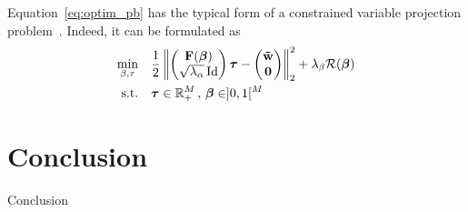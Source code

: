 Equation~\eqref{eq:optim_pb} has the typical form of a constrained variable
projection problem~\cite{Golub_G_2003_j-inv-prob_separable_nlsvpma}.
Indeed, it can be formulated as
\begin{equation}
  \begin{aligned}
    \min_{\beta,\tau} \quad &
    \frac{1}{2} \left\lVert\begin{pmatrix}\mathbf{F}(\boldsymbol{\beta}) \\ \sqrt{\lambda_{\alpha}}\operatorname{\mathrm{Id}}\end{pmatrix}\boldsymbol{\tau}
        - \begin{pmatrix}\boldsymbol{\tilde{\mathbf{w}}}\\ \mathbf{0} \end{pmatrix}\right\rVert_{2}^{2}
    + \lambda_{\beta}\mathcal{R}(\boldsymbol{\beta}) \\
    \textrm{s.t.} \quad &
    \boldsymbol{\tau} \in \mathbb{R}^{M}_{+} \, , \, \boldsymbol{\beta} \in ]0,1[^{M}
  \end{aligned}
\end{equation}


\section{}


\section{Conclusion}
\label{sec:concl}

Conclusion
